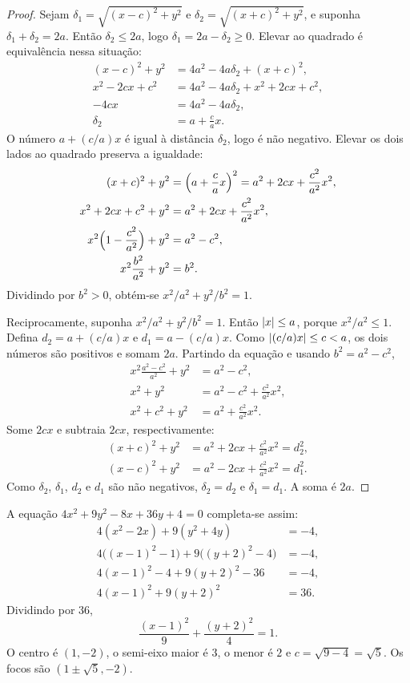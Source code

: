 \documentclass[11pt,a4paper]{article}
\begin{document}
\begin{proof}
Sejam $\delta_1=\sqrt{(x-c)^2+y^2}$ e $\delta_2=\sqrt{(x+c)^2+y^2}$, e suponha $\delta_1+\delta_2=2a$. Então $\delta_2\le 2a$, logo $\delta_1=2a-\delta_2\ge 0$. Elevar ao quadrado é equivalência nessa situação:
\begin{align*}
(x-c)^2+y^2&=4a^2-4a\delta_2+(x+c)^2,\\
x^2-2cx+c^2&=4a^2-4a\delta_2+x^2+2cx+c^2,\\
-4cx&=4a^2-4a\delta_2,\\
\delta_2&=a+\frac{c}{a}x.
\end{align*}
O número $a+(c/a)x$ é igual à distância $\delta_2$, logo é não negativo. Elevar os dois lados ao quadrado preserva a igualdade: 
\begin{align*}
(x+c)^2+y^2&=\Bigl(a+\frac{c}{a}x\Bigr)^2
=a^2+2cx+\frac{c^2}{a^2}x^2,\\
x^2+2cx+c^2+y^2&=a^2+2cx+\frac{c^2}{a^2}x^2,\\
x^2\Bigl(1-\frac{c^2}{a^2}\Bigr)+y^2&=a^2-c^2,\\
x^2\frac{b^2}{a^2}+y^2&=b^2.
\end{align*}
Dividindo por $b^2>0$, obtém-se $x^2/a^2+y^2/b^2=1$.

Reciprocamente, suponha $x^2/a^2+y^2/b^2=1$. Então $\left\lvert x \right\rvert\le a$, porque $x^2/a^2\le 1$. Defina $d_2=a+(c/a)x$ e $d_1=a-(c/a)x$. Como $\left\lvert (c/a)x \right\rvert\le c<a$, os dois números são positivos e somam $2a$. Partindo da equação e usando $b^2=a^2-c^2$,
\begin{align*}
x^2\frac{a^2-c^2}{a^2}+y^2&=a^2-c^2,\\
x^2+y^2&=a^2-c^2+\frac{c^2}{a^2}x^2,\\
x^2+c^2+y^2&=a^2+\frac{c^2}{a^2}x^2.
\end{align*}
Some $2cx$ e subtraia $2cx$, respectivamente:
\begin{align*}
(x+c)^2+y^2&=a^2+2cx+\frac{c^2}{a^2}x^2=d_2^2,\\
(x-c)^2+y^2&=a^2-2cx+\frac{c^2}{a^2}x^2=d_1^2.
\end{align*}
Como $\delta_2$, $\delta_1$, $d_2$ e $d_1$ são não negativos, $\delta_2=d_2$ e $\delta_1=d_1$. A soma é $2a$.
\end{proof}

\begin{exemplo}
A equação $4x^2+9y^2-8x+36y+4=0$ completa-se assim:
\begin{align*}
4(x^2-2x)+9(y^2+4y)&=-4,\\
4\bigl((x-1)^2-1\bigr)+9\bigl((y+2)^2-4\bigr)&=-4,\\
4(x-1)^2-4+9(y+2)^2-36&=-4,\\
4(x-1)^2+9(y+2)^2&=36.
\end{align*}
Dividindo por $36$,
\[
\frac{(x-1)^2}{9}+\frac{(y+2)^2}{4}=1.
\]
O centro é $(1,-2)$, o semi-eixo maior é $3$, o menor é $2$ e $c=\sqrt{9-4}=\sqrt{5}$. Os focos são $(1\pm\sqrt{5},-2)$.
\end{exemplo}
\end{document}
